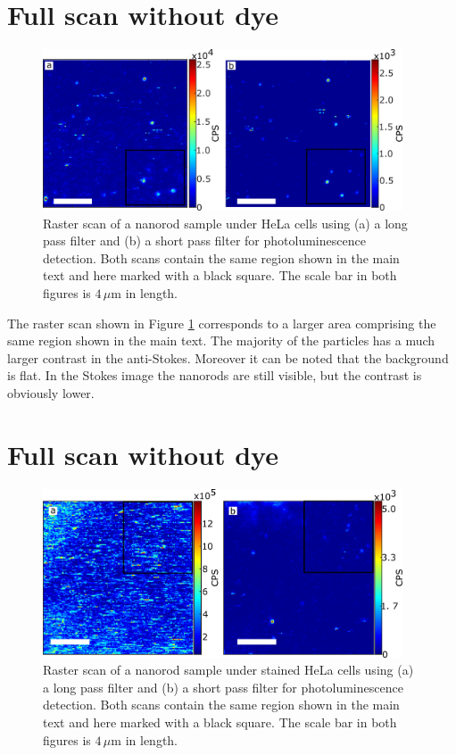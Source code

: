 \documentclass[journal=nalefd,manuscript=letter]{achemso}
\newcommand{\um}{\ensuremath{\,\mu\textrm{m}}}
\begin{document}
\section{Full scan without dye}
\begin{figure}[htp] \centering
\includegraphics[width=0.95\textwidth]{Figures/Supplementary/06_Full_scans/full_no_dye.png}
\caption{Raster scan of a nanorod sample under HeLa cells using (a) a long pass
filter and (b) a short pass filter for photoluminescence detection. Both scans
contain the same region shown in the main text and here marked with a black
square. The scale bar in both figures is $4\um$ in length.}
	\label{fig:full_no_dye}
\end{figure}

The raster scan shown in Figure \ref{fig:full_no_dye} corresponds to a larger
area comprising the same region shown in the main text. The majority of the
particles has a much larger contrast in the anti-Stokes. Moreover it can be
noted that the background is flat. In the Stokes image the nanorods are still
visible, but the contrast is obviously lower.

\section{Full scan without dye}
\begin{figure}[htp] \centering
\includegraphics[width=0.95\textwidth]{Figures/Supplementary/07_Full_scans_dye/full_with_dye.png}
\caption{Raster scan of a nanorod sample under stained HeLa cells using (a) a
long pass filter and (b) a short pass filter for photoluminescence detection. Both scans
contain the same region shown in the main text and here marked with a black
square. The scale bar in both figures is $4\um$ in length.}
	\label{fig:full_with_dye}
\end{figure}
\end{document}
